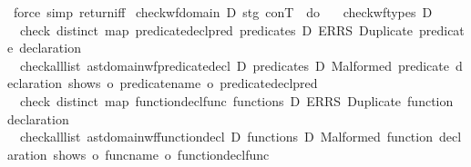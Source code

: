 \begin{isabellebody}
\ {\isacharparenleft}{\kern0pt}force\ simp{\isacharcolon}{\kern0pt}\ return{\isacharunderscore}{\kern0pt}iff{\isacharparenright}{\kern0pt}%
\endisatagproof
{\isafoldproof}%
%
\isadelimproof
\isanewline
%
\endisadelimproof
\isanewline
{}\isamarkupfalse%
\ {\isachardoublequoteopen}check{\isacharunderscore}{\kern0pt}wf{\isacharunderscore}{\kern0pt}domain\ D\ stg\ conT\ {\isasymequiv}\ do\ {\isacharbraceleft}{\kern0pt}\isanewline
\ \ check{\isacharunderscore}{\kern0pt}wf{\isacharunderscore}{\kern0pt}types\ D{\isacharsemicolon}{\kern0pt}\isanewline
\ \ check\ {\isacharparenleft}{\kern0pt}distinct\ {\isacharparenleft}{\kern0pt}map\ {\isacharparenleft}{\kern0pt}predicate{\isacharunderscore}{\kern0pt}decl{\isachardot}{\kern0pt}pred{\isacharparenright}{\kern0pt}\ {\isacharparenleft}{\kern0pt}predicates\ D{\isacharparenright}{\kern0pt}{\isacharparenright}{\kern0pt}{\isacharparenright}{\kern0pt}\ {\isacharparenleft}{\kern0pt}ERRS\ {\isacharprime}{\kern0pt}{\isacharprime}{\kern0pt}Duplicate\ predicate\ declaration{\isacharprime}{\kern0pt}{\isacharprime}{\kern0pt}{\isacharparenright}{\kern0pt}{\isacharsemicolon}{\kern0pt}\isanewline
\ \ check{\isacharunderscore}{\kern0pt}all{\isacharunderscore}{\kern0pt}list\ {\isacharparenleft}{\kern0pt}ast{\isacharunderscore}{\kern0pt}domain{\isachardot}{\kern0pt}wf{\isacharunderscore}{\kern0pt}predicate{\isacharunderscore}{\kern0pt}decl\ D{\isacharparenright}{\kern0pt}\ {\isacharparenleft}{\kern0pt}predicates\ D{\isacharparenright}{\kern0pt}\ {\isacharprime}{\kern0pt}{\isacharprime}{\kern0pt}Malformed\ predicate\ declaration{\isacharprime}{\kern0pt}{\isacharprime}{\kern0pt}\ {\isacharparenleft}{\kern0pt}shows\ o\ predicate{\isachardot}{\kern0pt}name\ o\ predicate{\isacharunderscore}{\kern0pt}decl{\isachardot}{\kern0pt}pred{\isacharparenright}{\kern0pt}{\isacharsemicolon}{\kern0pt}\isanewline
\ \ check\ {\isacharparenleft}{\kern0pt}distinct\ {\isacharparenleft}{\kern0pt}map\ {\isacharparenleft}{\kern0pt}function{\isacharunderscore}{\kern0pt}decl{\isachardot}{\kern0pt}func{\isacharparenright}{\kern0pt}\ {\isacharparenleft}{\kern0pt}functions\ D{\isacharparenright}{\kern0pt}{\isacharparenright}{\kern0pt}{\isacharparenright}{\kern0pt}\ {\isacharparenleft}{\kern0pt}ERRS\ {\isacharprime}{\kern0pt}{\isacharprime}{\kern0pt}Duplicate\ function\ declaration{\isacharprime}{\kern0pt}{\isacharprime}{\kern0pt}{\isacharparenright}{\kern0pt}{\isacharsemicolon}{\kern0pt}\isanewline
\ \ check{\isacharunderscore}{\kern0pt}all{\isacharunderscore}{\kern0pt}list\ {\isacharparenleft}{\kern0pt}ast{\isacharunderscore}{\kern0pt}domain{\isachardot}{\kern0pt}wf{\isacharunderscore}{\kern0pt}function{\isacharunderscore}{\kern0pt}decl\ D{\isacharparenright}{\kern0pt}\ {\isacharparenleft}{\kern0pt}functions\ D{\isacharparenright}{\kern0pt}\ {\isacharprime}{\kern0pt}{\isacharprime}{\kern0pt}Malformed\ function\ declaration{\isacharprime}{\kern0pt}{\isacharprime}{\kern0pt}\ {\isacharparenleft}{\kern0pt}shows\ o\ func{\isachardot}{\kern0pt}name\ o\ function{\isacharunderscore}{\kern0pt}decl{\isachardot}{\kern0pt}func{\isacharparenright}{\kern0pt}{\isacharsemicolon}{\kern0pt}\isanewline

\end{isabellebody}
